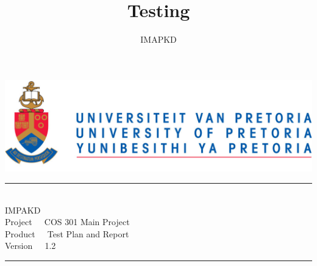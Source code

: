 \documentclass[a4paper,12pt]{article}
\author{IMAPKD}
\title{ Testing}
\newcommand{\HRule}{\rule{\linewidth}{0.5mm}}
\begin{document}
\setlength{\parskip}{6pt}

\begin{titlepage}

\begin{center}
\includegraphics[width=1\textwidth]{./University_of_Pretoria_Logo.PNG}\\[0.4cm]  


\HRule \\[0.4cm]
{\LARGE IMPAKD}\\[0.8cm]
{\LARGE Project $\>$ $\>$   COS 301 Main Project}\\[0.5cm]
{\LARGE Product $\>$ $\>$  Test Plan and Report}\\[0.8cm]
{\LARGE Version $\>$ $\>$  1.2}\\
\HRule \\[4cm]  






\end{center}
\end{titlepage}
\end{document}
